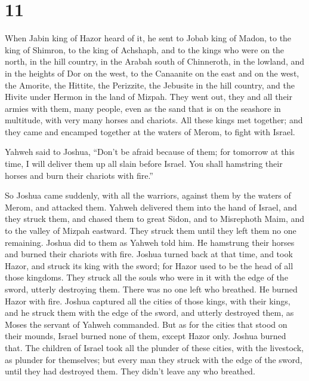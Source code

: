 \hypertarget{section-10}{%
\section{11}\label{section-10}}

 When Jabin king of Hazor heard of it, he sent to Jobab king
of Madon, to the king of Shimron, to the king of Achshaph, 
and to the kings who were on the north, in the hill country, in the
Arabah south of Chinneroth, in the lowland, and in the heights of Dor on
the west,  to the Canaanite on the east and on the west, the
Amorite, the Hittite, the Perizzite, the Jebusite in the hill country,
and the Hivite under Hermon in the land of Mizpah.  They
went out, they and all their armies with them, many people, even as the
sand that is on the seashore in multitude, with very many horses and
chariots.  All these kings met together; and they came and
encamped together at the waters of Merom, to fight with Israel.

 Yahweh said to Joshua, ``Don't be afraid because of them;
for tomorrow at this time, I will deliver them up all slain before
Israel. You shall hamstring their horses and burn their chariots with
fire.''

 So Joshua came suddenly, with all the warriors, against
them by the waters of Merom, and attacked them.  Yahweh
delivered them into the hand of Israel, and they struck them, and chased
them to great Sidon, and to Misrephoth Maim, and to the valley of Mizpah
eastward. They struck them until they left them no one remaining.
 Joshua did to them as Yahweh told him. He hamstrung their
horses and burned their chariots with fire.  Joshua turned
back at that time, and took Hazor, and struck its king with the sword;
for Hazor used to be the head of all those kingdoms.  They
struck all the souls who were in it with the edge of the sword, utterly
destroying them. There was no one left who breathed. He burned Hazor
with fire.  Joshua captured all the cities of those kings,
with their kings, and he struck them with the edge of the sword, and
utterly destroyed them, as Moses the servant of Yahweh commanded.
 But as for the cities that stood on their mounds, Israel
burned none of them, except Hazor only. Joshua burned that.
 The children of Israel took all the plunder of these
cities, with the livestock, as plunder for themselves; but every man
they struck with the edge of the sword, until they had destroyed them.
They didn't leave any who breathed.

